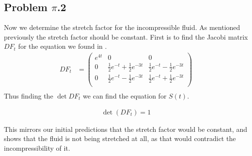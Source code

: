 \documentclass[10pt]{article}
\begin{document}
\begin{multicols}{2}
\subsection{Problem $\pi$.2}\label{sub:problem_pi_2}

Now we determine the stretch factor for the incompressible fluid. As mentioned
previously the stretch factor should be constant. First is to find the Jacobi
matrix $DF_t$ for the equation we found in .
\begin{align*}
    DF_t &= \begin{pmatrix}
      e^{4t} & 0 & 0 \\
      0 & \frac{1}{2}e^{-t} + \frac{1}{2}e^{-3t} & \frac{1}{2}e^{-t} - \frac{1}{2}e^{-3t}\\
      0 & \frac{1}{2}e^{-t} - \frac{1}{2}e^{-3t} & \frac{1}{2}e^{-t} + \frac{1}{2}e^{-3t}\\
    \end{pmatrix} \\
\end{align*}
Thus finding the $\det DF_t$ we can find the equation for $S(t)$.

\begin{align*}
  \det \left(DF_t\right) = 1
\end{align*}

This mirrors our initial predictions that the stretch factor would be constant,
and shows that the fluid is not being stretched at all, as that would
contradict the incompressibility of it.

\end{multicols}
\end{document}
